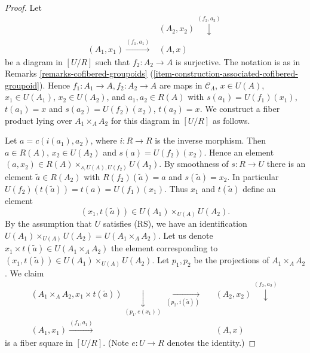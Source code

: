 \begin{proof}
Let
$$
\begin{array}{cc} & (A_2, x_2) \overset{(f_2, a_2)}{\downarrow} \\ (A_1, x_1) \overset{(f_1, a_1)}{\longrightarrow} & (A, x)\end{array}
$$
be a diagram in $[U/R]$ such that $f_2: A_2 \to A$ is surjective. The
notation is as in
Remarks \ref{remarks-cofibered-groupoids}
(\ref{item-construction-associated-cofibered-groupoid}).
Hence $f_1: A_1 \to A, f_2: A_2 \to A$ are maps in
$\mathcal{C}_\Lambda$, $x \in U(A)$, $x_1 \in U(A_1)$, $x_2 \in U(A_2)$,
and $a_1, a_2 \in R(A)$ with $s(a_1) = U(f_1)(x_1)$,
$t(a_1) = x$ and $s(a_2) = U(f_2)(x_2)$, $t(a_2) = x$.
We construct a fiber product lying over $A_1 \times_A A_2$
for this diagram in $[U/R]$ as follows.

\medskip\noindent
Let $a = c(i(a_1), a_2)$, where $i: R \to R$ is the inverse morphism.
Then $a \in R(A)$, $x_2 \in U(A_2)$ and $s(a) = U(f_2)(x_2)$.
Hence an element $(a, x_2) \in R(A) \times_{s, U(A), U(f_2)} U(A_2)$.
By smoothness of $s : R \to U$ there is an element
$\widetilde{a} \in R(A_2)$ with $R(f_2)(\widetilde{a}) = a$ and
$s(\widetilde{a}) = x_2$. In particular
$U(f_2)(t(\widetilde{a})) = t(a) = U(f_1)(x_1)$. Thus $x_1$ and
$t(\widetilde{a})$ define an element
$$
(x_1, t(\widetilde{a})) \in U(A_1) \times_{U(A)} U(A_2).
$$
By the assumption that $U$ satisfies (RS), we have an identification
$U(A_1) \times_{U(A)} U(A_2) = U(A_1 \times_A A_2)$. Let us denote
$x_1 \times t(\widetilde{a}) \in U(A_1 \times_A A_2)$ the element
corresponding to $(x_1, t(\widetilde{a})) \in U(A_1) \times_{U(A)} U(A_2)$.
Let $p_1, p_2$ be the projections of $A_1 \times_A A_2$.  We claim
$$
\begin{array}{ccc}(A_1 \times_A A_2, x_1 \times t(\widetilde{a})) \underset{(p_1, e(x_1))}{\downarrow}\underset{(p_2, i(\widetilde{a}))}{\longrightarrow} &  & (A_2, x_2) \overset{(f_2, a_2)}{\downarrow} \\ (A_1, x_1) \overset{(f_1, a_1)}{\longrightarrow} &  & (A, x)\end{array}
$$
is a fiber square in $[U/R]$. (Note $e: U \to R$ denotes the identity.)


\end{proof}

